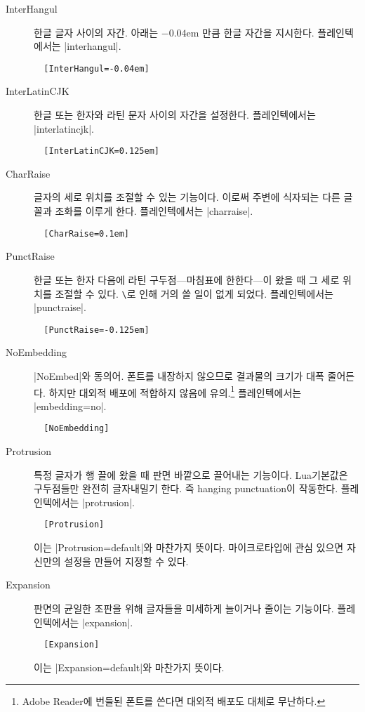 \documentclass[a4paper]{article}
\def\cs#1{\texttt{\color{MidnightBlue}\textbackslash\detokenize{#1}}}
\begin{document}
\begin{description}
  \item[InterHangul] {한글 글자
    사이의 자간}.  아래는 $-0.04$em 만큼 한글
  자간을 지시한다. 플레인텍에서는 |interhangul|.
\begin{verbatim}
  [InterHangul=-0.04em]
\end{verbatim}

\item[InterLatinCJK] 한글 또는 한자와 라틴 문자 사이의 자간을
  설정한다. 플레인텍에서는 |interlatincjk|.
\begin{verbatim}
  [InterLatinCJK=0.125em]
\end{verbatim}

\item[CharRaise] 글자의 세로 위치를
  { 조절}할 수 있는 기능이다.
  이로써 주변에 식자되는 다른 글꼴과 조화를 이루게 한다.
  플레인텍에서는 |charraise|.
\begin{verbatim}
  [CharRaise=0.1em]
\end{verbatim}

\item[PunctRaise] 한글 또는 한자 다음에 라틴 구두점---마침표에
  한한다---이 왔을 때 그 세로 위치를 조절할 수 있다.
  \cs{hangulpunctuations}로 인해 거의 쓸 일이 없게 되었다.
  플레인텍에서는 |punctraise|.
\begin{verbatim}
  [PunctRaise=-0.125em]
\end{verbatim}

\item[NoEmbedding] |NoEmbed|와 동의어.
  폰트를 내장하지 않으므로 결과물의 크기가 대폭 줄어든다.
  하지만 대외적 배포에 적합하지 않음에 유의.\footnote{%
    Adobe Reader에 번들된 폰트를 쓴다면 대외적 배포도 대체로 무난하다.}
  플레인텍에서는 |embedding=no|.
\begin{verbatim}
  [NoEmbedding]
\end{verbatim}

\item[Protrusion] 특정 글자가 행 끌에 왔을 때 판면 바깥으로 끌어내는
  기능이다.  Lua 기본값은 구두점들만 완전히 글자내밀기 한다. 즉
  hanging punctuation이 작동한다.  플레인텍에서는 |protrusion|.
\begin{verbatim}
  [Protrusion]
\end{verbatim}
  이는 |Protrusion=default|와 마찬가지 뜻이다.  마이크로타입에 관심
  있으면 자신만의 설정을 만들어 지정할 수 있다.

\item[Expansion] 판면의 균일한 조판을 위해 글자들을 미세하게 늘이거나
  줄이는 기능이다.  플레인텍에서는 |expansion|.
\begin{verbatim}
  [Expansion]
\end{verbatim}
  이는 |Expansion=default|와 마찬가지 뜻이다.

\end{description}
\end{document}
